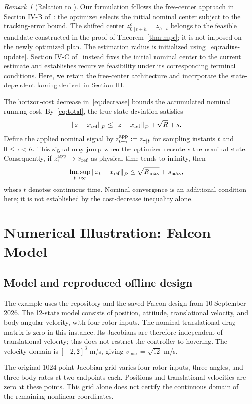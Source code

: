 \documentclass[11pt,a4paper]{article}
\numberwithin{equation}{section}
\theoremstyle{remark}\newtheorem{remark}{Remark}
\newcommand{\norm}[1]{\left\lVert#1\right\rVert}
\begin{document}
\par\medskip
\begin{remark}[Relation to \cite{kohler2021}]
Our formulation follows the free-center approach in Section IV-B of~\cite{kohler2021}: the optimizer selects the initial nominal center subject to the tracking-error bound. The shifted center $z^c_{0\mid t+h}=z_{h\mid t}$ belongs to the feasible candidate constructed in the proof of Theorem~\ref{thm:mpc}; it is not imposed on the newly optimized plan. The estimation radius is initialized using~\eqref{eq:radius-update}. Section IV-C of~\cite{kohler2021} instead fixes the initial nominal center to the current estimate and establishes recursive feasibility under its corresponding terminal conditions. Here, we retain the free-center architecture and incorporate the state-dependent forcing derived in Section III.
\end{remark}
The horizon-cost decrease in~\eqref{eq:decrease} bounds the accumulated nominal running cost. By~\eqref{eq:total}, the true-state deviation satisfies
\[
\norm{x-x_{\rm ref}}_P\le\norm{z-x_{\rm ref}}_P+\sqrt R+s.
\]
Define the applied nominal signal by $z^{\rm app}_{t+\tau}:=z_{\tau\mid t}$ for sampling instants $t$ and $0\le\tau<h$. This signal may jump when the optimizer recenters the nominal state. Consequently, if $z^{\rm app}_t\to x_{\rm ref}$ as physical time tends to infinity, then
\[
\limsup_{t\to\infty}\norm{x_{t}-x_{\rm ref}}_P
\le\sqrt{R_{\max}}+s_{\max},
\]
where $t$ denotes continuous time. Nominal convergence is an additional condition here; it is not established by the cost-decrease inequality alone.
\section{Numerical Illustration: Falcon Model}
\subsection{Model and reproduced offline design}
The example uses the repository \cite{rohmpc} and the saved Falcon design from 10 September 2026. The 12-state model consists of position, attitude, translational velocity, and body angular velocity, with four rotor inputs. The nominal translational drag matrix is zero in this instance. Its Jacobians are therefore independent of translational velocity; this does not restrict the controller to hovering. The velocity domain is $[-2,2]^3$ m/s, giving $v_{\max}=\sqrt{12}$ m/s.

The original 1024-point Jacobian grid varies four rotor inputs, three angles, and three body rates at two endpoints each. Positions and translational velocities are zero at these points. This grid alone does not certify the continuous domain of the remaining nonlinear coordinates.
\end{document}
